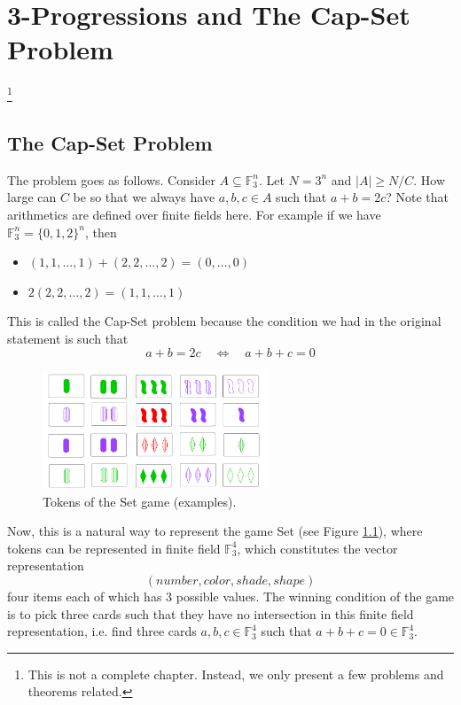 \chapter{3-Progressions and The Cap-Set Problem}\footnote{This is not a complete chapter. Instead, we only present a few problems and theorems related. }

\section{The Cap-Set Problem}
The problem goes as follows. Consider $A \subseteq \mathbb F_3^n$. Let $N = 3^n$ and $|A| \geq N / C$. How large can $C$ be so that we always have $a, b, c \in A$ such that $a + b = 2c$? Note that arithmetics are defined over finite fields here. For example if we have $\mathbb F _3^n = \{0, 1, 2\}^n$, then
\begin{itemize}
	\item $(1, 1, \dots, 1) + (2, 2, \dots, 2) = (0, \dots, 0)$
	\item $2 (2, 2, \dots, 2) = (1, 1, \dots, 1)$
\end{itemize}

This is called the Cap-Set problem because the condition we had in the original statement is such that 
\begin{equation}
	a + b = 2c \quad \iff \quad a + b + c = 0 
\end{equation}

\begin{figure}[h]
	\center
	\includegraphics[width=0.6\textwidth]{figs/setgane.png}
	\caption{Tokens of the Set game (examples).}
	\label{fig:setgame}
\end{figure}
Now, this is a natural way to represent the game Set (see Figure \ref{fig:setgame}), where tokens can be represented in finite field $\mathbb F_3^4$, which constitutes the vector representation
\begin{equation}
	(number, color, shade, shape)
\end{equation} 
four items each of which has 3 possible values. The winning condition of the game is to pick three cards such that they have no intersection in this finite field representation, i.e. find three cards $a, b, c \in \mathbb F_3^4$ such that $a + b + c = 0 \in \mathbb F_3^4$. 

